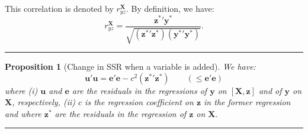 \documentclass[
]{book}
\newtheorem{proposition}{Proposition}[chapter]
\theoremstyle{definition}
\theoremstyle{definition}
\theoremstyle{definition}
\theoremstyle{definition}
\theoremstyle{remark}
\begin{document}
This correlation is denoted by \(r_{yz}^\mathbf{X}\). By definition, we have:
\begin{equation}
r_{yz}^\mathbf{X} = \frac{\mathbf{z^*}'\mathbf{y^*}}{\sqrt{(\mathbf{z^*}'\mathbf{z^*})(\mathbf{y^*}'\mathbf{y^*})}}.\label{eq:pc}
\end{equation}

\begin{center}\rule{0.5\linewidth}{0.5pt}\end{center}

\begin{proposition}[Change in SSR when a variable is added]
\protect\hypertarget{prp:chgeR2}{}\label{prp:chgeR2}We have:
\begin{equation}
\mathbf{u}'\mathbf{u} = \mathbf{e}'\mathbf{e} - c^2(\mathbf{z^*}'\mathbf{z^*}) \qquad (\le \mathbf{e}'\mathbf{e}) \label{eq:uu}
\end{equation}
where (i) \(\mathbf{u}\) and \(\mathbf{e}\) are the residuals in the regressions of \(\mathbf{y}\) on \([\mathbf{X},\mathbf{z}]\) and of \(\mathbf{y}\) on \(\mathbf{X}\), respectively, (ii) \(c\) is the regression coefficient on \(\mathbf{z}\) in the former regression and where \(\mathbf{z}^*\) are the residuals in the regression of \(\mathbf{z}\) on \(\mathbf{X}\).
\end{proposition}

\begin{center}\rule{0.5\linewidth}{0.5pt}\end{center}
\end{document}
